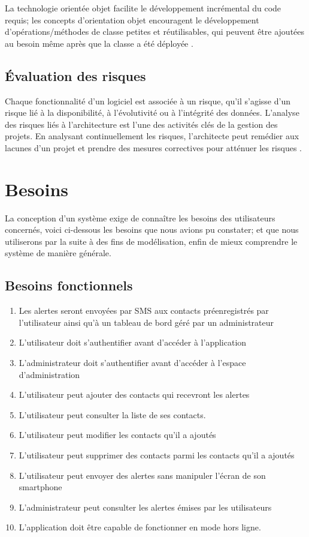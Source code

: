 La technologie orientée objet facilite le développement incrémental du code requis; les concepts d'orientation objet encouragent le développement d'opérations/méthodes de classe petites et réutilisables, qui peuvent être ajoutées au besoin même après que la classe a été déployée \cite{the_dsdm_consortium_dsdm}.


\subsection{Évaluation des risques}
Chaque fonctionnalité d’un logiciel est associée à un risque, qu'il s'agisse d'un risque lié à la disponibilité, à l'évolutivité ou à l'intégrité des données. L'analyse des risques liés à l'architecture est l'une des activités clés de la gestion des projets. En analysant continuellement les risques, l'architecte peut remédier aux lacunes d’un projet et prendre des mesures correctives pour atténuer les risques \cite{mark_richards_fundamentals}.

\section{Besoins}
La conception d’un système exige de connaître les besoins des utilisateurs concernés, voici ci-dessous les besoins que nous avions pu constater; et que nous utiliserons par la suite à des fins de modélisation, enfin de mieux comprendre le système de manière générale.

\subsection{Besoins fonctionnels}
\begin{enumerate}
	\item Les alertes seront envoyées par SMS aux contacts préenregistrés par l'utilisateur ainsi qu'à un tableau de bord géré par un administrateur
	\item L’utilisateur doit s’authentifier avant d’accéder à l’application
	\item L’administrateur doit s’authentifier avant d’accéder à l’espace d’administration
	\item L’utilisateur peut ajouter des contacts qui recevront les alertes
	\item L’utilisateur peut consulter la liste de ses contacts.
	\item L’utilisateur peut modifier les contacts qu’il a ajoutés
	\item L’utilisateur peut supprimer des contacts parmi les contacts qu’il a ajoutés
	\item L'utilisateur peut envoyer des alertes sans manipuler l'écran de son smartphone
	\item L’administrateur peut consulter les alertes émises par les utilisateurs
	\item L'application doit être capable de fonctionner en mode hors ligne.
\end{enumerate}

